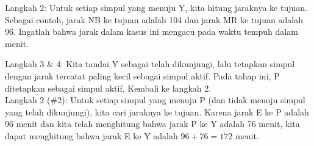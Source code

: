 \begin{example}{}
\noindent Langkah 2:  Untuk setiap simpul yang menuju Y, kita hitung jaraknya ke tujuan.  Sebagai contoh, jarak NB ke tujuan adalah 104 dan jarak MR ke tujuan adalah 96.  Ingatlah bahwa jarak dalam kasus ini mengacu pada waktu tempuh dalam menit.\\
\par{}\label{fig:graphtheory-dor1-tikz18}%


\noindent Langkah 3 \& 4:  Kita tandai Y sebagai telah dikunjungi, lalu tetapkan simpul dengan jarak tercatat paling kecil sebagai simpul aktif.  Pada tahap ini, P ditetapkan sebagai simpul aktif.  Kembali ke langkah 2.\\

\newpage
\noindent Langkah 2 (\#2):  Untuk setiap simpul yang menuju P (dan tidak menuju simpul yang telah dikunjungi), kita cari jaraknya ke tujuan.  Karena jarak E ke P adalah 96 menit dan kita telah menghitung bahwa jarak P ke Y adalah 76 menit, kita dapat menghitung bahwa jarak E ke Y adalah $96+76 = 172$ menit.  \\


\end{example}

